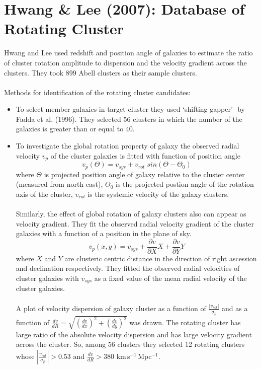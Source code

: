 \section{Hwang \& Lee (2007): Database of Rotating Cluster}
Hwang and Lee used redshift and position angle of galaxies to estimate the ratio of cluster rotation amplitude to dispersion and the velocity gradient across the clusters. They took 899 Abell clusters as their sample clusters.\\\\
Methods for identification of the rotating cluster candidates:
\begin{itemize}
\item To select member galaxies in target cluster they used \textquoteleft shifting gapper\textquoteright\,\, by Fadda et al. (1996). They selected 56 clusters in which the number of the galaxies is greater than or equal to 40.
\item To investigate the global rotation property of galaxy the observed radial velocity $v_p$ of the cluster galaxies is fitted with function of position angle $$v_p(\Theta)=v_{sys}+v_{rot}\;sin(\Theta-\Theta_0)$$ where $\Theta$ is projected position angle of galaxy relative to the cluster center (measured from north east), $\Theta_0$ is the projected postion angle of the rotation axis of the cluster, $v_{rot}$ is the systemic velocity of the galaxy clusters.\\\\
Similarly, the effect of global rotation of galaxy clusters also can appear as velocity gradient. They fit the observed radial velocity gradient of the cluster galaxies with a function of a position in the plane of sky.
$$
	v_p(x,y)=v_{sys}+\frac{\partial v}{\partial X}X+\frac{\partial v}{\partial Y}Y
$$ where $X$ and $Y$  are clusteric centric distance in the direction of right ascession and declination respectively. They fitted the observed radial velocities of cluster galaxies with $v_{sys}$ as a fixed value of the mean radial velocity of the cluster galaxies.\\\\
A plot of velocity dispersion of galaxy cluster as a function of $\frac{|v_{rot}|}{\sigma_p}$ and as a function of $\frac{dv}{dR}=\sqrt{\left(\frac{dv}{dx}\right)^2+\left(\frac{dv}{dy}\right)^2}$ was drawn. The rotating cluster has large ratio of the absolute velocity dispersion and has large velocity gradient across the cluster. So, among 56 clusters they selected 12 rotating clusters whose $|\frac{v_{rot}}{\sigma_p}|>0.53$ and $\frac{dv}{dR}>380$ km\,s$^{-1}$\,Mpc$^{-1}$.
\end{itemize}

